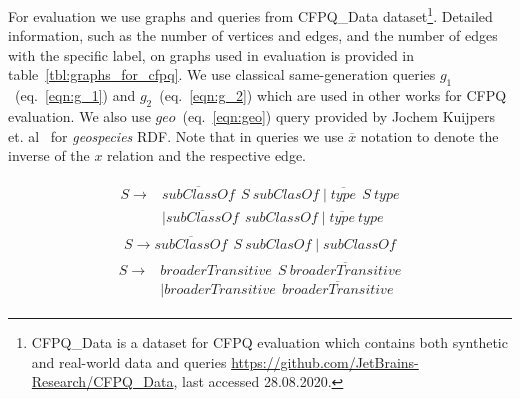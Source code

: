 For evaluation we use graphs and queries from CFPQ\_Data dataset\footnote{CFPQ\_Data is a dataset for CFPQ evaluation which contains both synthetic and real-world data and queries \url{https://github.com/JetBrains-Research/CFPQ\_Data}, last accessed 28.08.2020.}.
Detailed information, such as the number of vertices and edges, and the number of edges with the specific label, on graphs used in evaluation is provided in table~\ref{tbl:graphs_for_cfpq}.
We use classical same-generation queries $g_1$~(eq.~\ref{eqn:g_1}) and $g_2$~(eq.~\ref{eqn:g_2}) which are used in other works for CFPQ evaluation.
We also use $geo$~(eq.~\ref{eqn:geo}) query provided by Jochem Kuijpers et. al~\cite{Kuijpers:2019:ESC:3335783.3335791} for \textit{geospecies} RDF.
Note that in queries we use $\overline{x}$ notation to denote the inverse of the $x$ relation and the respective edge.

\begin{align}
\begin{split}
\label{eqn:g_1}
S \to & \overline{\textit{subClassOf}} \ \ S \ \textit{subClasOf} \mid \overline{\textit{type}} \ \ S \ \textit{type}\\   & \mid \overline{\textit{subClassOf}} \ \ \textit{subClassOf} \mid \overline{\textit{type}} \ \textit{type}
\end{split}
\end{align}
\begin{align}
\label{eqn:g_2}
S \to \overline{\textit{subClassOf}} \ \ S \ \textit{subClasOf} \mid \textit{subClassOf}
\end{align}
\begin{align}
\begin{split}
\label{eqn:geo}
S \to & \textit{broaderTransitive} \ \  S \ \overline{\textit{broaderTransitive}} \\
      & \mid \textit{broaderTransitive} \ \  \overline{\textit{broaderTransitive}}
\end{split}
\end{align}

